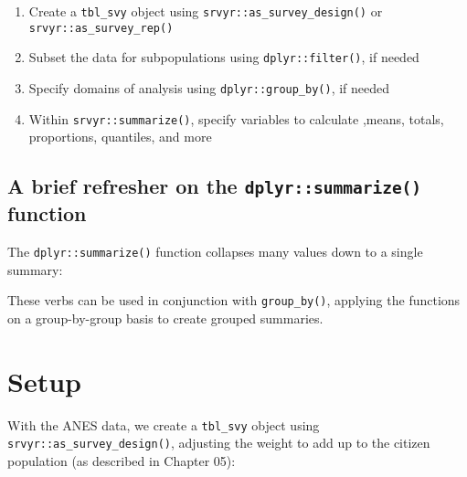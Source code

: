 \documentclass[
]{krantz}
\providecommand{\tightlist}{%
  \setlength{\itemsep}{0pt}\setlength{\parskip}{0pt}}
\begin{document}
\begin{enumerate}
\def\labelenumi{\arabic{enumi}.}
\tightlist
\item
  Create a \texttt{tbl\_svy} object using \texttt{srvyr::as\_survey\_design()} or \texttt{srvyr::as\_survey\_rep()}
\item
  Subset the data for subpopulations using \texttt{dplyr::filter()}, if needed
\item
  Specify domains of analysis using \texttt{dplyr::group\_by()}, if needed
\item
  Within \texttt{srvyr::summarize()}, specify variables to calculate ,means, totals, proportions, quantiles, and more
\end{enumerate}

\hypertarget{a-brief-refresher-on-the-dplyrsummarize-function}{%
\subsection{\texorpdfstring{A brief refresher on the \texttt{dplyr::summarize()} function}{A brief refresher on the dplyr::summarize() function}}\label{a-brief-refresher-on-the-dplyrsummarize-function}}

The \texttt{dplyr::summarize()} function collapses many values down to a single summary:

These verbs can be used in conjunction with \texttt{group\_by()}, applying the functions on a group-by-group basis to create grouped summaries.

\hypertarget{setup}{%
\section{Setup}\label{setup}}

With the ANES data, we create a \texttt{tbl\_svy} object using \texttt{srvyr::as\_survey\_design()}, adjusting the weight to add up to the citizen population (as described in Chapter 05):
\end{document}
